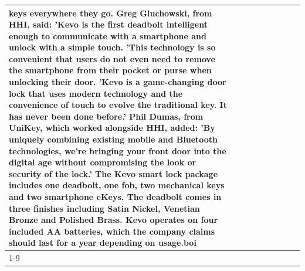 \begin{table}[H]
\begin{tabular}{lllrlllll}
keys everywhere they go. Greg Gluchowski, from HHI, said: 'Kevo is the first deadbolt intelligent enough to communicate with a smartphone and unlock with a simple touch. 'This technology is so convenient that users do not even need to remove the smartphone from their pocket or purse when unlocking their door. 'Kevo is a game-changing door lock that uses modern technology and the convenience of touch to evolve the traditional key. It has never been done before.' Phil Dumas, from UniKey, which worked alongside HHI, added: 'By uniquely combining existing mobile and Bluetooth technologies, we’re bringing your front door into the digital age without compromising the look or security of the lock.' The Kevo smart lock package includes one deadbolt, one fob, two mechanical keys and two smartphone eKeys. The deadbolt comes in three finishes including Satin Nickel, Venetian Bronze and Polished Brass. Kevo operates on four included AA batteries, which the company claims should last for a year depending on usage.boi \\
\cline{1-9}

\end{tabular}
\end{table}

